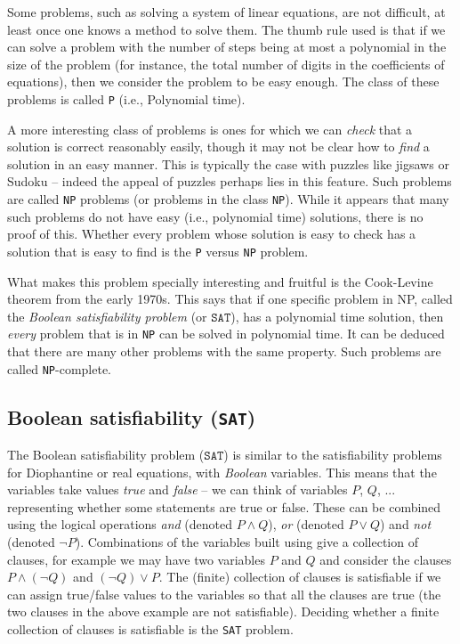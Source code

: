 \documentclass{amsart}
\theoremstyle{plain}
\theoremstyle{definition}
\theoremstyle{remark}
\begin{document}
Some problems, such as solving a system of linear equations, are not
difficult, at least once one knows a method to solve them. The thumb
rule used is that if we can solve a problem with the number of steps
being at most a polynomial in the size of the problem (for instance, the
total number of digits in the coefficients of equations), then we
consider the problem to be easy enough. The class of these problems is
called \texttt{P} (i.e., Polynomial time).

A more interesting class of problems is ones for which we can
\emph{check} that a solution is correct reasonably easily, though it may
not be clear how to \emph{find} a solution in an easy manner. This is
typically the case with puzzles like jigsaws or Sudoku -- indeed the
appeal of puzzles perhaps lies in this feature. Such problems are called
\texttt{NP} problems (or problems in the class \texttt{NP}). While it appears that
many such problems do not have easy (i.e., polynomial time) solutions,
there is no proof of this. Whether every problem whose solution is easy
to check has a solution that is easy to find is the \texttt{P} versus \texttt{NP}
problem.

What makes this problem specially interesting and fruitful is the
Cook-Levine theorem from the early 1970s. This says that if one specific
problem in NP, called the \emph{Boolean satisfiability problem} (or
\(\texttt{SAT}\)), has a polynomial time solution, then \emph{every} problem that
is in \texttt{NP} can be solved in polynomial time. It can be deduced that
there are many other problems with the same property. Such problems are
called \texttt{NP}-complete.

\subsection{Boolean satisfiability (\texttt{SAT})}

The Boolean satisfiability problem (\(\texttt{SAT}\)) is similar to the satisfiability
problems for Diophantine or real equations, with \emph{Boolean} variables.
This means that the variables take values \emph{true} and \emph{false} -- we
can think of variables $P$, $Q$, ... representing whether some statements are
true or false. These can be combined using the logical operations \emph{and}
(denoted $P\wedge Q$), \emph{or} (denoted $P\vee Q$) and \emph{not} (denoted $\neg P$).
Combinations of the variables built using give a collection of clauses, for example we
may have two variables $P$ and $Q$ and consider the clauses $P\wedge(\neg Q)$ and $(\neg Q)\vee P$.
The (finite) collection of clauses is satisfiable if we can assign true/false values to the variables
so that all the clauses are true (the two clauses in the above example are not satisfiable). 
Deciding whether a finite collection of clauses is satisfiable is 
the \texttt{SAT} problem.
\end{document}
